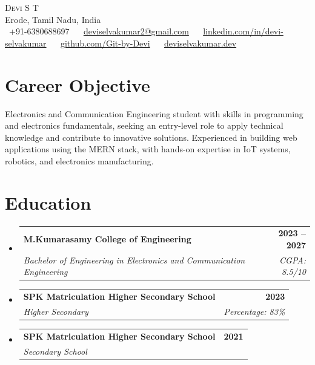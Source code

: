 \documentclass[letterpaper,11pt]{article}
\makeatletter
\newcommand{\resumeSubheading}[4]{
  \vspace{-2pt}\item
  \begin{tabular*}{1.0\textwidth}[t]{l@{\extracolsep{\fill}}r}
    \textbf{#1} & \textbf{\small #2} \\
    \textit{\small#3} & \textit{\small #4} \\
  \end{tabular*}\vspace{-7pt}
}
\newcommand{\resumeSubHeadingListStart}{\begin{itemize}[leftmargin=0.0in, label={}]}
\newcommand{\resumeSubHeadingListEnd}{\end{itemize}}
\makeatother
\begin{document}
\begin{center}
    {\Huge \scshape Devi S T} \\ \vspace{1pt}
    Erode, Tamil Nadu, India \\ \vspace{1pt}
    \small
    \faPhone\ +91-6380688697 ~
    \faEnvelope\ \href{mailto:deviselvakumar2@gmail.com}{deviselvakumar2@gmail.com} ~
    \faLinkedin\ \href{https://www.linkedin.com/in/devi-selvakumar}{linkedin.com/in/devi-selvakumar} ~
    \faGithub\ \href{https://github.com/Git-by-Devi}{github.com/Git-by-Devi} ~
    \faGlobe\ \href{https://deviselvakumar.dev}{deviselvakumar.dev}
    \vspace{-8pt}
\end{center}

\section{Career Objective}
\small{
Electronics and Communication Engineering student with skills in programming and electronics fundamentals, seeking an entry-level role to apply technical knowledge and contribute to innovative solutions. Experienced in building web applications using the MERN stack, with hands-on expertise in IoT systems, robotics, and electronics manufacturing.
}

\section{Education}
\resumeSubHeadingListStart
  \resumeSubheading
    {M.Kumarasamy College of Engineering}{2023 -- 2027}
    {Bachelor of Engineering in Electronics and Communication Engineering}{CGPA: 8.5/10}
  \resumeSubheading
    {SPK Matriculation Higher Secondary School}{2023}
    {Higher Secondary}{Percentage: 83\%}
  \resumeSubheading
    {SPK Matriculation Higher Secondary School}{2021}
    {Secondary School}{}
\resumeSubHeadingListEnd

\end{document}
